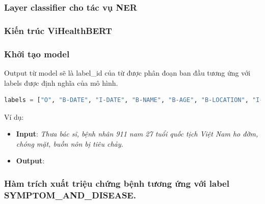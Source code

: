 \subsubsection{Layer classifier cho tác vụ NER}


\subsubsection{Kiến trúc ViHealthBERT}


\subsubsection{Khởi tạo model}


Output từ model sẽ là label\_id của từ được phân đoạn ban đầu tương ứng với labels được định nghĩa của mô hình.
\begin{lstlisting}[language=Python]
labels = ["O", "B-DATE", "I-DATE", "B-NAME", "B-AGE", "B-LOCATION", "I-LOCATION", "B-JOB", "I-JOB","B-ORGANIZATION", "I-ORGANIZATION", "B-PATIENT_ID", "B-SYMPTOM_AND_DISEASE", "I-SYMPTOM_AND_DISEASE","B-GENDER", "B-TRANSPORTATION", "I-TRANSPORTATION", "I-NAME", "I-PATIENT_ID", "I-AGE", "I-GENDER"]
\end{lstlisting}
Ví dụ:
\begin{itemize}
\item \textbf{Input}: \textit{Thưa bác sĩ, bệnh nhân 911 nam 27 tuổi quốc tịch Việt Nam ho đờm, chóng mặt, buồn nôn bị tiêu chảy.}
\item \textbf{Output}:
\vietnameselst

\end{itemize}

\subsubsection{Hàm trích xuất triệu chứng bệnh tương ứng với label \textbf{SYMPTOM\_AND\_DISEASE}.}

